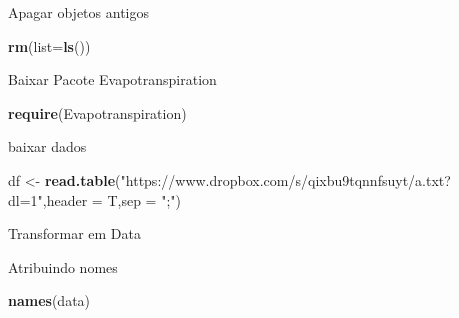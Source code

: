 \documentclass[
]{book}
\newenvironment{Shaded}{\begin{snugshade}}{\end{snugshade}}
\newcommand{\DataTypeTok}[1]{\textcolor[rgb]{0.13,0.29,0.53}{#1}}
\newcommand{\DecValTok}[1]{\textcolor[rgb]{0.00,0.00,0.81}{#1}}
\newcommand{\KeywordTok}[1]{\textcolor[rgb]{0.13,0.29,0.53}{\textbf{#1}}}
\newcommand{\NormalTok}[1]{#1}
\newcommand{\OperatorTok}[1]{\textcolor[rgb]{0.81,0.36,0.00}{\textbf{#1}}}
\newcommand{\StringTok}[1]{\textcolor[rgb]{0.31,0.60,0.02}{#1}}
\begin{document}
Apagar objetos antigos

\begin{Shaded}
\begin{Highlighting}[]
\KeywordTok{rm}\NormalTok{(}\DataTypeTok{list=}\KeywordTok{ls}\NormalTok{())}
\end{Highlighting}
\end{Shaded}

Baixar Pacote Evapotranspiration

\begin{Shaded}
\begin{Highlighting}[]
\KeywordTok{require}\NormalTok{(Evapotranspiration)}
\end{Highlighting}
\end{Shaded}

baixar dados

\begin{Shaded}
\begin{Highlighting}[]
\NormalTok{df <-}\StringTok{ }\KeywordTok{read.table}\NormalTok{(}\StringTok{"https://www.dropbox.com/s/qixbu9tqnnfsuyt/a.txt?dl=1"}\NormalTok{,}\DataTypeTok{header =}\NormalTok{ T,}\DataTypeTok{sep =} \StringTok{";"}\NormalTok{)}
\end{Highlighting}
\end{Shaded}

Transformar em Data

\begin{Shaded}
\end{Shaded}

Atribuindo nomes

\begin{Shaded}
\begin{Highlighting}[]
\KeywordTok{names}\NormalTok{(data)}
\end{Highlighting}
\end{Shaded}
\end{document}
